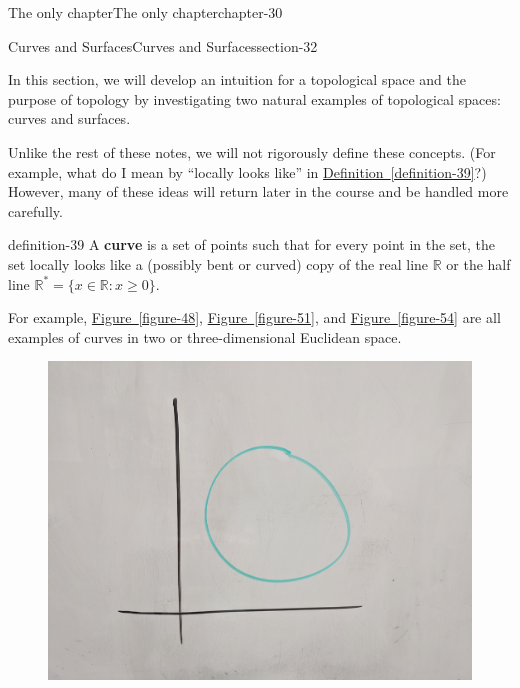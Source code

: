\documentclass[oneside,10pt,]{book}
\newcommand{\terminology}[1]{\textbf{#1}}
\begin{document}
\setcounter{tocdepth}{1}
\renewcommand*\contentsname{Contents}
\tableofcontents
\mainmatter
%
%
\typeout{************************************************}
\typeout{************************************************}
%
\begin{chapterptx}{The only chapter}{}{The only chapter}{}{}{chapter-30}
%
%
\typeout{************************************************}
\typeout{************************************************}
%
\begin{sectionptx}{Curves and Surfaces}{}{Curves and Surfaces}{}{}{section-32}
\begin{introduction}{}%
\hypertarget{p-35}{}%
In this section, we will develop an intuition for a topological space and the purpose of topology by investigating two natural examples of topological spaces: curves and surfaces.%
\par
\hypertarget{p-36}{}%
Unlike the rest of these notes, we will not rigorously define these concepts. (For example, what do I mean by ``locally looks like'' in \hyperref[definition-39]{Definition~\ref{definition-39}}?)  However, many of these ideas will return later in the course and be handled more carefully.%
\end{introduction}%
\begin{definition}{}{definition-39}%
\hypertarget{p-40}{}%
A \terminology{curve} is a set of points such that for every point in the set, the set locally looks like a (possibly bent or curved) copy of the real line \(\mathbb R\) or the half line \(\mathbb R^*=\{x\in\mathbb R:x\geq 0\}\).%
\end{definition}
\hypertarget{p-44}{}%
For example, \hyperref[figure-48]{Figure~\ref{figure-48}}, \hyperref[figure-51]{Figure~\ref{figure-51}}, and \hyperref[figure-54]{Figure~\ref{figure-54}} are all examples of curves in two or three-dimensional Euclidean space.%
\begin{figure}
\centering
\includegraphics[width=1\linewidth]{images/circle.jpg}

\end{figure}
\end{sectionptx}
\end{chapterptx}
\end{document}
